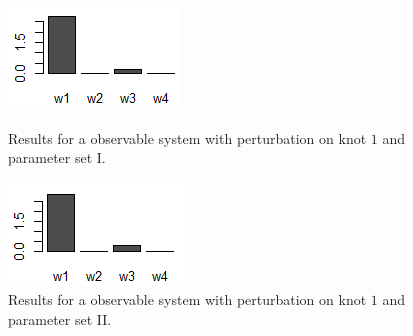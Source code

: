 \begin{figure}[h]
\centering

	\begin{minipage}{0.45\textwidth}		 
		\centering
		\includegraphics[width=\textwidth]{bilder/D13_I.png}
   		\caption{Results for a observable system with perturbation on knot $1$ 
   		 	and parameter set I.} 
   		 \label{fig:HIO_I}
	\end{minipage}
	\hfill
	\begin{minipage}{0.45\textwidth}
		\vspace{0.0pt} 
		\centering
   		\includegraphics[width=\textwidth]{bilder/D13_II.png}
		\caption{Results for a observable system with perturbation on knot $1$ and 
			parameter set II.} 
		\label{fig:HIO_II}
	\end{minipage}

\end{figure}
	